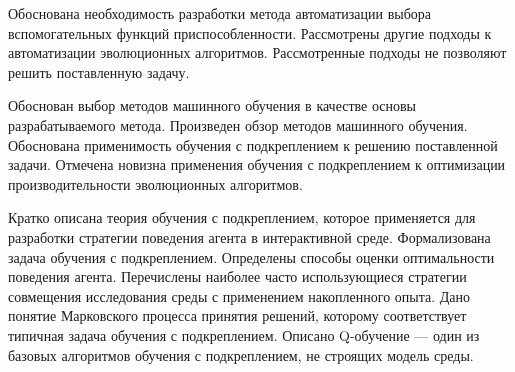 Обоснована необходимость разработки метода автоматизации выбора вспомогательных функций приспособленности. Рассмотрены другие подходы к автоматизации эволюционных алгоритмов. Рассмотренные подходы не позволяют решить поставленную задачу. 

Обоснован выбор методов машинного обучения в качестве основы разрабатываемого метода. Произведен обзор методов машинного обучения. Обоснована применимость обучения с подкреплением к решению поставленной задачи. Отмечена новизна применения обучения с подкреплением к оптимизации производительности эволюционных алгоритмов.

Кратко описана теория обучения с подкреплением, которое применяется для разработки стратегии поведения агента в интерактивной среде. Формализована задача обучения с подкреплением. Определены способы оценки оптимальности поведения агента. Перечислены наиболее часто использующиеся стратегии совмещения исследования среды с применением накопленного опыта. Дано понятие Марковского процесса принятия решений, которому соответствует типичная задача обучения с подкреплением. Описано Q-обучение --- один из базовых алгоритмов обучения с подкреплением, не строящих модель среды.

\label{summary_1}


